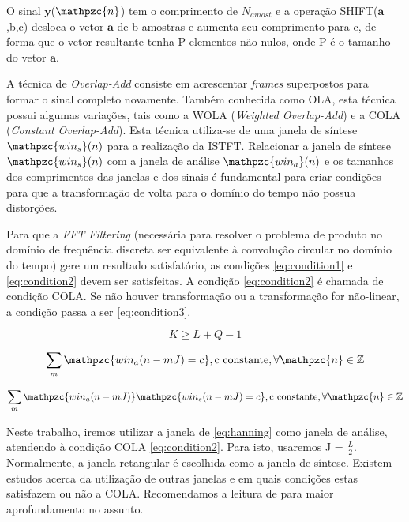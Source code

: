         O sinal $\mathbf{y}$($\mathpzc{n}$) tem o comprimento de $N_{amost}$ e a operação SHIFT($\mathbf{a}$,b,c) desloca o vetor $\mathbf{a}$ de b amostras e aumenta seu comprimento para c, de forma que o vetor resultante tenha P elementos não-nulos, onde P é o tamanho do vetor $\mathbf{a}$.
        
        A técnica de \textit{Overlap-Add} consiste em acrescentar \textit{frames} superpostos para formar o sinal completo novamente. Também conhecida como OLA, esta técnica possui algumas variações, tais como a WOLA (\textit{Weighted Overlap-Add}) e a COLA (\textit{Constant Overlap-Add}). Esta técnica utiliza-se de uma janela de síntese $\mathpzc{win_s}(n)$ para a realização da ISTFT. Relacionar a janela de síntese $\mathpzc{win_s}(n)$ com a janela de análise $\mathpzc{win_a}(n)$ e os tamanhos dos comprimentos das janelas e dos sinais é fundamental para criar condições para que a transformação de volta para o domínio do tempo não possua distorções. 
        
        Para que a \textit{FFT Filtering} (necessária para resolver o problema de produto no domínio de  frequência discreta ser equivalente à convolução circular no domínio do tempo) gere um resultado satisfatório, as condições \ref{eq:condition1} e \ref{eq:condition2} devem ser satisfeitas. A condição \ref{eq:condition2} é chamada de condição COLA. Se não houver transformação ou a transformação for não-linear, a condição passa a ser \ref{eq:condition3}. 
        
        \begin{equation}\label{eq:condition1}
            K \geq L + Q - 1
        \end{equation}
        
        \begin{equation}\label{eq:condition2}
            \sum_m \mathpzc{win_a(n - mJ) = c},\text{c constante}, \forall\mathpzc{n} \in \mathbb{Z}
        \end{equation}
        
        \begin{equation}\label{eq:condition3}
            \sum_m \mathpzc{win_a(n - mJ)}\mathpzc{win_s(n - mJ) = c}, \text{c constante}, \forall\mathpzc{n} \in \mathbb{Z}
        \end{equation}
        
        
        Neste trabalho, iremos utilizar a janela de  \ref{eq:hanning} como janela de análise, atendendo à condição COLA \ref{eq:condition2}. Para isto, usaremos J = $\frac{L}{2}$. Normalmente, a janela retangular é escolhida como a janela de síntese. Existem estudos acerca da utilização de outras janelas e em quais condições estas satisfazem ou não a COLA. Recomendamos a leitura de \cite{LuizVictorio} para maior aprofundamento no assunto.
        
